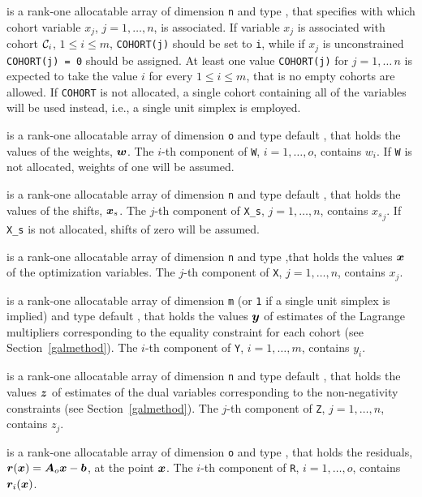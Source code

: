 \documentclass{galahad}
\begin{document}
\begin{description}
 is a rank-one allocatable array of dimension {\tt n} and type
\integer, that specifies with which cohort variable $x_j$, $j = 1,\ldots,n$, 
is associated. If variable $x_j$ is associated with cohort $\calC_i$, 
$1 \leq i \leq m$, {\tt COHORT(j)} should be set to {\tt i}, while if $x_j$ 
is unconstrained {\tt COHORT(j) = 0} should be assigned. At least one value 
{\tt COHORT(j)} for $j = 1,\ldots\,n$ is expected to take the value $i$ 
for every $1 \leq i \leq m$, that is no empty cohorts are allowed.
If {\tt COHORT} is not allocated, a single cohort containing all of
the variables will be used instead, i.e., a single unit simplex is employed.

 is a rank-one allocatable array of dimension {\tt o} and type default
\realdp, that holds the values of the weights, ${\bm{w}}$.
The $i$-th component of {\tt W}, $i = 1,  \ldots , o$, contains $w_{i}$.
If {\tt W} is not allocated, weights of one will be assumed.

 is a rank-one allocatable array of dimension {\tt n} and type 
default \realdp, that holds the values of the shifts, ${\bm{x}}_s$.
The $j$-th component of {\tt X\_s}, $j = 1,  \ldots ,  n$, contains ${x_s}_{j}$.
If {\tt X\_s} is not allocated, shifts of zero will be assumed.

 is a rank-one allocatable array of dimension {\tt n} and type
\realdp,that holds the values ${\bm{x}}$ of the optimization variables.
The $j$-th component of {\tt X}, $j = 1,  \ldots , n$, contains $x_{j}$.

 is a rank-one allocatable array of dimension {\tt m} (or {\tt 1} if
a single unit simplex is implied) and type default \realdp, that holds
the values ${\bm{y}}$ of estimates of the Lagrange multipliers
corresponding to the equality constraint for each cohort 
(see Section~\ref{galmethod}).
The $i$-th component of {\tt Y}, $i = 1,  \ldots ,  m$, contains $y_{i}$.

 is a rank-one allocatable array of dimension {\tt n} and type default
\realdp, that holds
the values ${\bm{z}}$ of estimates  of the dual variables
corresponding to the non-negativity constraints (see Section~\ref{galmethod}).
The $j$-th component of {\tt Z}, $j = 1,  \ldots ,  n$, contains $z_{j}$.

 is a rank-one allocatable array of dimension {\tt o} and type
\realdp, that holds the residuals, ${\bm{r}}({\bm{x}}) = {\bm{A}}_o {\bm{x}} - {\bm{b}}$,
at the point ${\bm{x}}$. The $i$-th component of
{\tt R}, $i = 1, \ldots, o$, contains ${\bm{r}}_{i}({\bm{x}})$.


\end{description}
\end{document}
